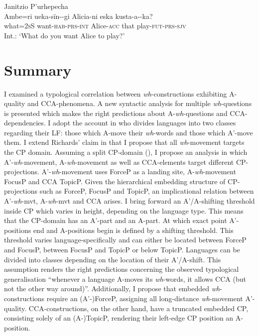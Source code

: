\documentclass[output=paper,colorlinks,citecolor=brown]{langscibook}
\begin{document}
\ea Janitzio P’urhepecha \citep[114]{zyman2018rich}\\
\gll * \textquestiondown Ambe=ri ueka-s\"{i}n-\varnothing-gi Alicia-ni eska kusta-a-\varnothing-ka?\\
{} what=\textsc{2sS} want-\textsc{hab-prs-int} Alice-\textsc{acc} that play-\textsc{fut-prs-sjv}\\
\glt \phantom{*} Int.: ‘What do you want Alice to play?'\\
\z 

\section{Summary}
I examined a typological correlation between \textit{wh}-constructions exhibiting A-quality and CCA-phenomena. A new syntactic analysis for multiple \textit{wh}-questions is presented which makes the right predictions about A-\textit{wh}-questions and CCA-dependencies. I adopt the account in \citet{richards1997} who divides languages into two classes regarding their LF: those which A-move their \textit{wh}-words and those which A'-move them. I extend Richards' claim in that I propose that all \textit{wh}-movement targets the CP domain. Assuming a split CP-domain (\citealp{rizzi1997fine}), I propose an analysis in which A'-\textit{wh}-movement, A-\textit{wh}-movement as well as CCA-elements target different CP-projections. A'-\textit{wh}-movement uses ForceP as a landing site, A-\textit{wh}-movement FocusP and CCA TopicP. Given the hierarchical embedding structure of CP-projections such as ForceP, FocusP and TopicP, an implicational relation between A'-\textit{wh}-mvt, A-\textit{wh}-mvt and CCA arises. I bring forward an A'/A-shifting threshold inside CP which varies in height, depending on the language type. This means that the CP-domain has an A'-part and an A-part. At which exact point A'-positions end and A-positions begin is defined by a shifting threshold. This threshold varies language-specifically and can either be located between ForceP and FocusP, between FocusP and TopicP or below TopicP. Languages can be divided into classes depending on the location of their A'/A-shift. This assumption renders the right predictions concerning the observed typological generalisation ``whenever a language A-moves its \textit{wh}-words, it allows CCA (but not the other way around)''.  Additionally, I propose that embedded \textit{wh}-constructions require an (A'-)ForceP, assigning all long-distance \textit{wh}-movement A'-quality. CCA-constructions, on the other hand, have a truncated embedded CP, consisting solely of an (A-)TopicP, rendering their left-edge CP position an A-position. 
\end{document}
